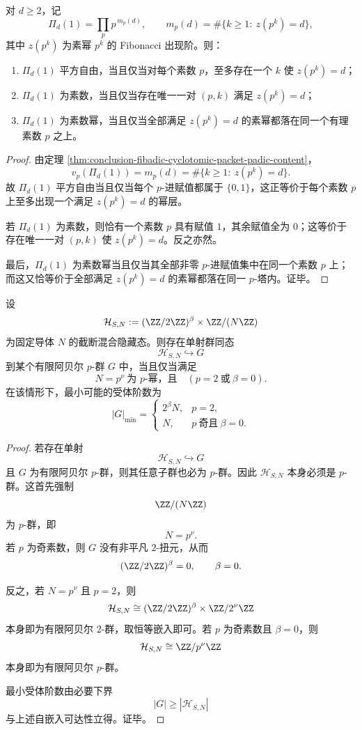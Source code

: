 \begin{proposition}\label{prop:conclusion-fibadic-depth-content-prime-power-detection}
对 \(d\ge 2\)，记
\[
\Pi_d(1)=\prod_p p^{\,m_p(d)},
\qquad
m_p(d)=\#\{k\ge 1:\ z(p^k)=d\},
\]
其中 \(z(p^k)\) 为素幂 \(p^k\) 的 Fibonacci 出现阶。则：
\begin{enumerate}
  \item \(\Pi_d(1)\) 平方自由，当且仅当对每个素数 \(p\)，至多存在一个 \(k\) 使 \(z(p^k)=d\)；
  \item \(\Pi_d(1)\) 为素数，当且仅当存在唯一一对 \((p,k)\) 满足 \(z(p^k)=d\)；
  \item \(\Pi_d(1)\) 为素数幂，当且仅当全部满足 \(z(p^k)=d\) 的素幂都落在同一个有理素数 \(p\) 之上。
\end{enumerate}
\end{proposition}
\begin{proof}
由定理 \ref{thm:conclusion-fibadic-cyclotomic-packet-padic-content}，
\[
v_p(\Pi_d(1))=m_p(d)=\#\{k\ge 1:\ z(p^k)=d\}.
\]
故 \(\Pi_d(1)\) 平方自由当且仅当每个 \(p\)-进赋值都属于 \(\{0,1\}\)，这正等价于每个素数 \(p\) 上至多出现一个满足 \(z(p^k)=d\) 的幂层。

若 \(\Pi_d(1)\) 为素数，则恰有一个素数 \(p\) 具有赋值 \(1\)，其余赋值全为 \(0\)；这等价于存在唯一一对 \((p,k)\) 使 \(z(p^k)=d\)。反之亦然。

最后，\(\Pi_d(1)\) 为素数幂当且仅当其全部非零 \(p\)-进赋值集中在同一个素数 \(p\) 上；而这又恰等价于全部满足 \(z(p^k)=d\) 的素幂都落在同一 \(p\)-塔内。证毕。
\end{proof}

\begin{theorem}\label{thm:conclusion-mixed-hidden-state-pprimary-faithful-receiver}
设
\[
\mathcal H_{S,N}:=(\ZZ/2\ZZ)^\beta\times \ZZ/(N\ZZ)
\]
为固定导体 \(N\) 的截断混合隐藏态。则存在单射群同态
\[
\mathcal H_{S,N}\hookrightarrow G
\]
到某个有限阿贝尔 \(p\)-群 \(G\) 中，当且仅当满足
\[
N=p^\nu\ \text{为 }p\text{-幂，且}\quad (p=2\ \text{或}\ \beta=0).
\]
在该情形下，最小可能的受体阶数为
\[
|G|_{\min}=
\begin{cases}
2^\beta N,& p=2,\\
N,& p\ \text{奇且}\ \beta=0.
\end{cases}
\]
\end{theorem}
\begin{proof}
若存在单射
\[
\mathcal H_{S,N}\hookrightarrow G
\]
且 \(G\) 为有限阿贝尔 \(p\)-群，则其任意子群也必为 \(p\)-群。因此 \(\mathcal H_{S,N}\) 本身必须是 \(p\)-群。这首先强制
\[
\ZZ/(N\ZZ)
\]
为 \(p\)-群，即
\[
N=p^\nu.
\]
若 \(p\) 为奇素数，则 \(G\) 没有非平凡 \(2\)-扭元，从而
\[
(\ZZ/2\ZZ)^\beta=0,
\qquad
\beta=0.
\]

反之，若 \(N=p^\nu\) 且 \(p=2\)，则
\[
\mathcal H_{S,N}\cong (\ZZ/2\ZZ)^\beta\times \ZZ/2^\nu\ZZ
\]
本身即为有限阿贝尔 \(2\)-群，取恒等嵌入即可。若 \(p\) 为奇素数且 \(\beta=0\)，则
\[
\mathcal H_{S,N}\cong \ZZ/p^\nu\ZZ
\]
本身即为有限阿贝尔 \(p\)-群。

最小受体阶数由必要下界
\[
|G|\ge |\mathcal H_{S,N}|
\]
与上述自嵌入可达性立得。证毕。
\end{proof}

